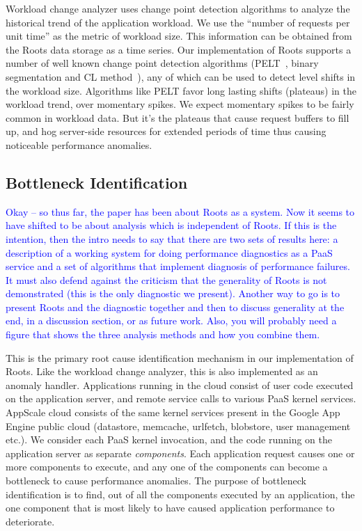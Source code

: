 Workload change analyzer uses change point detection algorithms to analyze the historical trend of 
the application workload. We use the ``number of requests
per unit time'' as the metric of workload size. This information can be obtained from the Roots
data storage as a time series. Our implementation of Roots supports a number of well known change point
detection algorithms (PELT~\cite{doi:10.1080/01621459.2012.737745}, binary segmentation 
and CL method~\cite{chen1993joint}), any of which can be used to detect level shifts in the
workload size. Algorithms like PELT favor long lasting shifts (plateaus) in the workload trend, over momentary spikes.
We expect momentary spikes to be fairly common in workload data. But it's the plateaus that cause
request buffers to fill up, and hog server-side resources for extended periods of time thus
causing noticeable performance anomalies.

\subsection{Bottleneck Identification}

\textcolor{blue}{Okay -- so thus far, the paper has been about Roots as a
system.  Now it seems to have shifted to be about analysis which is independent
of Roots.  If this is the intention, then the intro needs to say that there
are two sets of results here: a description of a working system for doing
performance diagnostics as a PaaS service and a set of algorithms that
implement diagnosis of performance failures.  It must also defend against the
criticism that the generality of Roots is not demonstrated (this is the only
diagnostic we present).  Another way to go is to present Roots and the
diagnostic together and then to discuss generality at the end, in a discussion
section, or as future work.  Also, you will probably need a figure that shows
the three analysis methods and how you combine them.} 

This is the primary root cause identification mechanism in our implementation of Roots. Like the workload
change analyzer, this is also implemented as an anomaly handler. Applications running in the cloud 
consist of user code executed on the application server, and remote 
service calls to various PaaS kernel services. AppScale cloud
consists of the same kernel services present in the Google App Engine public cloud (datastore, memcache,
urlfetch, blobstore, user management etc.).
We consider each PaaS kernel invocation, and the code running on the application server as 
separate \textit{components}. Each application request causes one or more components to
execute, and any one of the components can become a bottleneck to cause performance anomalies.  
The purpose of bottleneck identification is to find, out of all
the components executed by an application, the one component that is most likely to have caused 
application performance to deteriorate.

